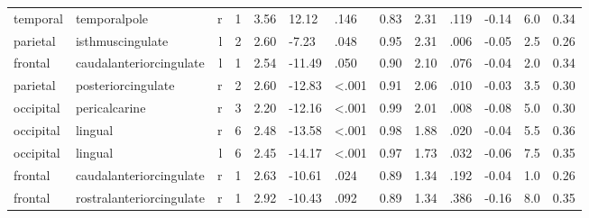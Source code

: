 \documentclass{article}
\begin{document}
\begin{longtable}{llrR{1.5cm}R{1cm}R{1.3cm}R{1cm}R{1cm}R{1.3cm}R{1cm}R{1.8cm}R{1.3cm}R{1.8cm}}
  temporal &              temporalpole &    r &            1 &                  3.56 &            12.12 &               .146 &                               0.83 &                          2.31 &                            .119 & -0.14 &    6.0 &      0.34 \\
  parietal &          isthmuscingulate &    l &            2 &                  2.60 &            -7.23 &               .048 &                               0.95 &                          2.31 &                            .006 & -0.05 &    2.5 &      0.26 \\
   frontal &   caudalanteriorcingulate &    l &            1 &                  2.54 &           -11.49 &               .050 &                               0.90 &                          2.10 &                            .076 & -0.04 &    2.0 &      0.34 \\
  parietal &        posteriorcingulate &    r &            2 &                  2.60 &           -12.83 &      \textless.001 &                               0.91 &                          2.06 &                            .010 & -0.03 &    3.5 &      0.30 \\
 occipital &             pericalcarine &    r &            3 &                  2.20 &           -12.16 &      \textless.001 &                               0.99 &                          2.01 &                            .008 & -0.08 &    5.0 &      0.30 \\
 occipital &                   lingual &    r &            6 &                  2.48 &           -13.58 &      \textless.001 &                               0.98 &                          1.88 &                            .020 & -0.04 &    5.5 &      0.36 \\
 occipital &                   lingual &    l &            6 &                  2.45 &           -14.17 &      \textless.001 &                               0.97 &                          1.73 &                            .032 & -0.06 &    7.5 &      0.35 \\
   frontal &   caudalanteriorcingulate &    r &            1 &                  2.63 &           -10.61 &               .024 &                               0.89 &                          1.34 &                            .192 & -0.04 &    1.0 &      0.26 \\
   frontal &  rostralanteriorcingulate &    r &            1 &                  2.92 &           -10.43 &               .092 &                               0.89 &                          1.34 &                            .386 & -0.16 &    8.0 &      0.35 \\

\end{longtable}
\end{document}
